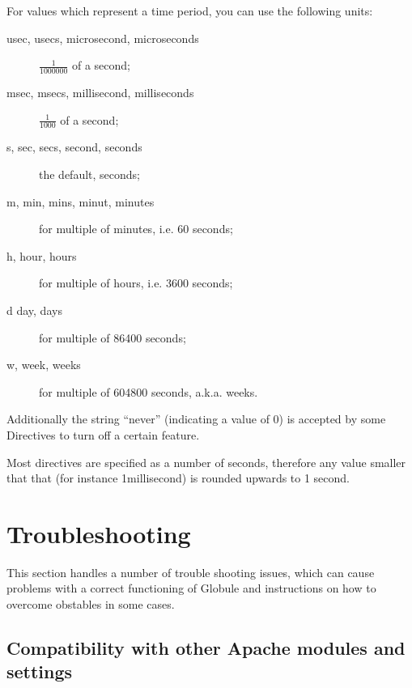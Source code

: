 \documentclass[10pt,a4paper]{article}
\makeatletter
\newenvironment{p}{\@open{P}{}}{\@close{P}}
\newenvironment{p}{}{\par}
\newcommand\sectionbr{}
\makeatother
\begin{document}
\begin{p}
For values which represent a time period, you can use the following units:

\begin{description}
\item[usec, usecs, microsecond, microseconds]
  $\frac{1}{1000000}$ of a second;
\item[msec, msecs, millisecond, milliseconds]
  $\frac{1}{1000}$ of a second;
\item[s, sec, secs, second, seconds]
  the default, seconds;
\item[m, min, mins, minut, minutes]
  for multiple of minutes, i.e. 60 seconds;
\item[h, hour, hours]
  for multiple of hours, i.e. 3600 seconds;
\item[d day, days]
  for multiple of 86400 seconds;
\item[w, week, weeks]
  for multiple of 604800 seconds, a.k.a. weeks.
\end{description}
\end{p}

\begin{p}
Additionally the string ``never'' (indicating a value of 0) is accepted by
some Directives to turn off a certain feature.
\end{p}

\begin{p}
Most directives are specified as a number of seconds, therefore any value
smaller that that (for instance 1millisecond) is rounded upwards to 1 second.
\end{p}


\newpage
\section{\label{sec:trouble}
  Troubleshooting\sectionbr}

\begin{p}
This section handles a number of trouble shooting issues, which can cause
problems with a correct functioning of Globule and instructions on how to
overcome obstables in some cases.
\end{p}

\subsection{Compatibility with other Apache modules and settings}
\end{document}
